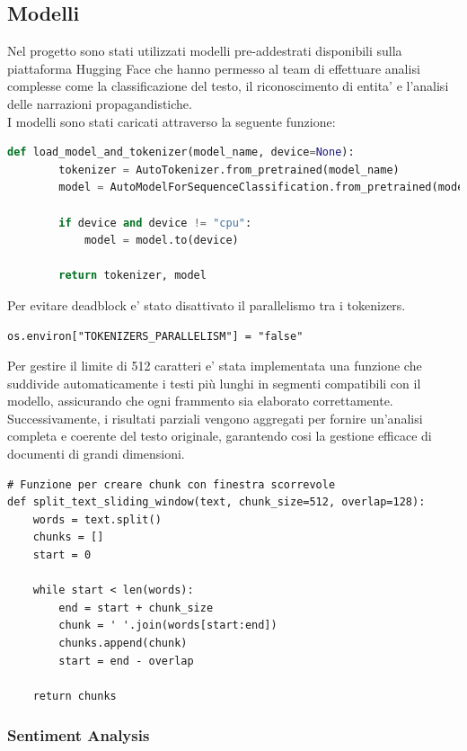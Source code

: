 \documentclass{article}
\begin{document}
	\subsection{Modelli}
	
	Nel progetto sono stati utilizzati modelli pre-addestrati disponibili sulla piattaforma Hugging Face che hanno permesso al team di effettuare analisi complesse come la classificazione del testo, il riconoscimento di entita' e l'analisi delle narrazioni propagandistiche.\\
	I modelli sono stati caricati attraverso la seguente funzione:
	\begin{lstlisting}[language=python]
	def load_model_and_tokenizer(model_name, device=None):
		tokenizer = AutoTokenizer.from_pretrained(model_name)
		model = AutoModelForSequenceClassification.from_pretrained(model_name)
		
		if device and device != "cpu":
			model = model.to(device)
		
		return tokenizer, model
	\end{lstlisting}
	Per evitare deadblock e' stato disattivato il parallelismo tra i tokenizers.
	\begin{lstlisting}
os.environ["TOKENIZERS_PARALLELISM"] = "false"
	\end{lstlisting}

	Per gestire il limite di 512 caratteri e' stata implementata una  funzione che suddivide automaticamente i testi più lunghi in segmenti compatibili con il modello, assicurando che ogni frammento sia elaborato correttamente.\\
	Successivamente, i risultati parziali vengono aggregati per fornire un'analisi completa e coerente del testo originale, garantendo cosi la gestione efficace di documenti di grandi dimensioni.
	\begin{lstlisting}
# Funzione per creare chunk con finestra scorrevole
def split_text_sliding_window(text, chunk_size=512, overlap=128):
	words = text.split()
	chunks = []
	start = 0
	
	while start < len(words):
		end = start + chunk_size
		chunk = ' '.join(words[start:end])
		chunks.append(chunk)
		start = end - overlap

	return chunks
	\end{lstlisting}

		\subsubsection{Sentiment Analysis}
	
\end{document}
